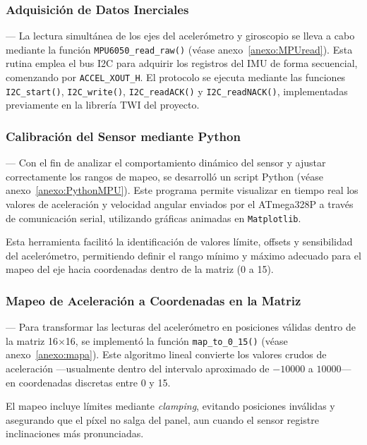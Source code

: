 \vspace{1em}

\subsubsection{Adquisición de Datos Inerciales} ---
La lectura simultánea de los ejes del acelerómetro y giroscopio se lleva a cabo mediante la función \texttt{MPU6050\_read\_raw()} (véase anexo~\ref{anexo:MPUread}). Esta rutina emplea el bus I2C para adquirir los registros del IMU de forma secuencial, comenzando por \texttt{ACCEL\_XOUT\_H}. El protocolo se ejecuta mediante las funciones \texttt{I2C\_start()}, \texttt{I2C\_write()}, \texttt{I2C\_readACK()} y \texttt{I2C\_readNACK()}, implementadas previamente en la librería TWI del proyecto.


\vspace{1em}

\subsubsection{Calibración del Sensor mediante Python} ---
Con el fin de analizar el comportamiento dinámico del sensor y ajustar correctamente los rangos de mapeo, se desarrolló un script Python (véase anexo~\ref{anexo:PythonMPU}). Este programa permite visualizar en tiempo real los valores de aceleración y velocidad angular enviados por el ATmega328P a través de comunicación serial, utilizando gráficas animadas en \texttt{Matplotlib}.

Esta herramienta facilitó la identificación de valores límite, offsets y sensibilidad del acelerómetro, permitiendo definir el rango mínimo y máximo adecuado para el mapeo del eje hacia coordenadas dentro de la matriz (0 a 15).

\vspace{1em}

\subsubsection{Mapeo de Aceleración a Coordenadas en la Matriz} ---
Para transformar las lecturas del acelerómetro en posiciones válidas dentro de la matriz 16$\times$16, se implementó la función \texttt{map\_to\_0\_15()} (véase anexo~\ref{anexo:mapa}). Este algoritmo lineal convierte los valores crudos de aceleración —usualmente dentro del intervalo aproximado de $-10000$ a $10000$— en coordenadas discretas entre 0 y 15.

El mapeo incluye límites mediante \textit{clamping}, evitando posiciones inválidas y asegurando que el píxel no salga del panel, aun cuando el sensor registre inclinaciones más pronunciadas.

